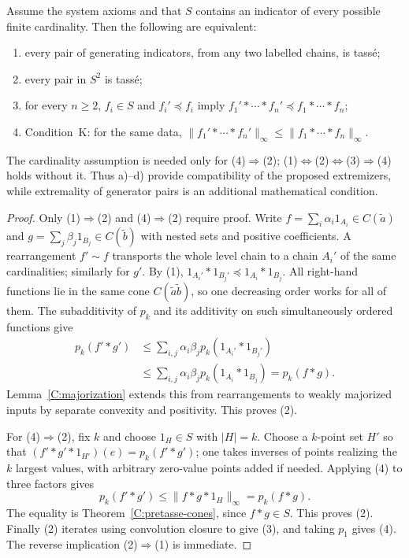 \begin{theorem}
\label{C:K-repair}
Assume the system axioms and that $S$ contains an indicator of every possible finite cardinality. Then the following are equivalent:
\begin{enumerate}
\item every pair of generating indicators, from any two labelled chains, is tass\'e;
\item every pair in $S^2$ is tass\'e;
\item for every $n\geq2$, $f_i\in S$ and $f_i'\preceq f_i$ imply
$f_1'*\cdots*f_n'\preceq f_1*\cdots*f_n$;
\item Condition~K: for the same data,
$\|f_1'*\cdots*f_n'\|_\infty\leq\|f_1*\cdots*f_n\|_\infty$.
\end{enumerate}
The cardinality assumption is needed only for (4)$\Rightarrow$(2); (1)$\Leftrightarrow$(2)$\Leftrightarrow$(3)$\Rightarrow$(4) holds without it. Thus a)--d) provide compatibility of the proposed extremizers, while extremality of generator pairs is an additional mathematical condition.
\end{theorem}
\begin{proof}
Only (1)$\Rightarrow$(2) and (4)$\Rightarrow$(2) require proof. Write
$f=\sum_i\alpha_i1_{A_i}\in C(\tilde a)$ and
$g=\sum_j\beta_j1_{B_j}\in C(\tilde b)$ with nested sets and positive coefficients. A rearrangement $f'\sim f$ transports the whole level chain to a chain $A_i'$ of the same cardinalities; similarly for $g'$. By (1),
$1_{A_i'}*1_{B_j'}\preceq1_{A_i}*1_{B_j}$.
All right-hand functions lie in the same cone $C(\tilde a\tilde b)$, so one decreasing order works for all of them. The subadditivity of $p_k$ and its additivity on such simultaneously ordered functions give
\begin{align*}
p_k(f'*g')
&\leq\sum_{i,j}\alpha_i\beta_jp_k(1_{A_i'}*1_{B_j'})\\
&\leq\sum_{i,j}\alpha_i\beta_jp_k(1_{A_i}*1_{B_j})
 =p_k(f*g).
\end{align*}
Lemma~\ref{C:majorization} extends this from rearrangements to weakly majorized inputs by separate convexity and positivity. This proves (2).

For (4)$\Rightarrow$(2), fix $k$ and choose $1_H\in S$ with $|H|=k$. Choose a $k$-point set $H'$ so that
$(f'*g'*1_{H'})(e)=p_k(f'*g')$; one takes inverses of points realizing the $k$ largest values, with arbitrary zero-value points added if needed. Applying (4) to three factors gives
\[
p_k(f'*g')\leq\|f*g*1_H\|_\infty=p_k(f*g).
\]
The equality is Theorem~\ref{C:pretasse-cones}, since $f*g\in S$. This proves (2). Finally (2) iterates using convolution closure to give (3), and taking $p_1$ gives (4). The reverse implication (2)$\Rightarrow$(1) is immediate.
\end{proof}

